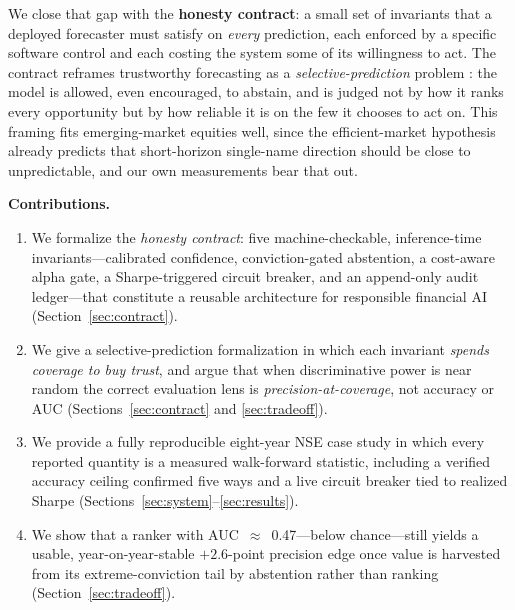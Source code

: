 \documentclass[conference]{IEEEtran}
\begin{document}
We close that gap with the \textbf{honesty contract}: a small set of invariants
that a deployed forecaster must satisfy on \emph{every} prediction, each enforced
by a specific software control and each costing the system some of its willingness
to act. The contract reframes trustworthy forecasting as a
\emph{selective-prediction} problem \cite{chow1970,elyaniv2010,geifman2017}: the
model is allowed, even encouraged, to abstain, and is judged not by how it ranks
every opportunity but by how reliable it is on the few it chooses to act on. This
framing fits emerging-market equities well, since the efficient-market hypothesis
\cite{fama1970} already predicts that short-horizon single-name direction should be
close to unpredictable, and our own measurements bear that out.

\noindent\textbf{Contributions.}
\begin{enumerate}
\item We formalize the \emph{honesty contract}: five machine-checkable,
inference-time invariants---calibrated confidence, conviction-gated abstention, a
cost-aware alpha gate, a Sharpe-triggered circuit breaker, and an append-only
audit ledger---that constitute a reusable architecture for responsible financial
AI (Section~\ref{sec:contract}).
\item We give a selective-prediction formalization in which each invariant
\emph{spends coverage to buy trust}, and argue that when discriminative power is
near random the correct evaluation lens is \emph{precision-at-coverage}, not
accuracy or AUC (Sections~\ref{sec:contract} and \ref{sec:tradeoff}).
\item We provide a fully reproducible eight-year NSE case study in which every
reported quantity is a measured walk-forward statistic, including a verified
accuracy ceiling confirmed five ways and a live circuit breaker tied to realized
Sharpe (Sections~\ref{sec:system}--\ref{sec:results}).
\item We show that a ranker with AUC~$\approx$~0.47---below chance---still yields a
usable, year-on-year-stable $+2.6$-point precision edge once value is harvested
from its extreme-conviction tail by abstention rather than ranking
(Section~\ref{sec:tradeoff}).
\end{enumerate}

\end{document}
